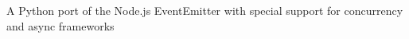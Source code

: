\begin{project}

  \begin{projectdescription}
    A Python port of the Node.js EventEmitter with special support for
    concurrency and async frameworks
  \end{projectdescription}
\end{project}
